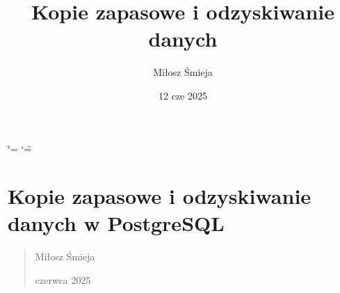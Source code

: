 \documentclass[letterpaper,10pt,polish]{sphinxmanual}
\title{Kopie zapasowe i odzyskiwanie danych}
\date{12 cze 2025}
\author{Miłosz Śmieja}
\begin{document}
\ifdefined\shorthandoff
  \ifnum\catcode`\=\string=\active\shorthandoff{=}\fi
  \ifnum\catcode`\"=\active{}\fi
\fi

\pagestyle{empty}
\sphinxmaketitle
\pagestyle{plain}
\sphinxtableofcontents
\pagestyle{normal}
\label{\detokenize{index::doc}}


\sphinxstepscope


\chapter{Kopie zapasowe i odzyskiwanie danych w PostgreSQL}
\label{\detokenize{kopie_zapasowe_i_odzyskiwanie_danych:kopie-zapasowe-i-odzyskiwanie-danych-w-postgresql}}\label{\detokenize{kopie_zapasowe_i_odzyskiwanie_danych::doc}}\begin{quote}\begin{description}
\sphinxAtStartPar
Miłosz Śmieja


 czerwca 2025

\end{description}\end{quote}
\end{document}
